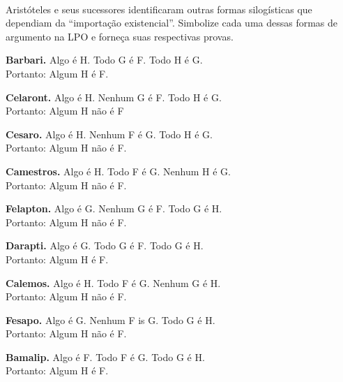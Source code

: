 \
 
\problempart
\label{pr.BarbaraEtc.proof2}
Aristóteles e seus sucessores identificaram outras formas silogísticas que dependiam da ``importação existencial''. Simbolize cada uma dessas formas de argumento na LPO e  forneça suas respectivas  provas.

\begin{earg}
	\item \textbf{Barbari.} Algo é H. Todo G é F. Todo H é G. \\  Portanto: Algum H é F.
	\item \textbf{Celaront.} Algo é H. Nenhum G é F. Todo H é G. \\ Portanto: Algum H não é F
	\item \textbf{Cesaro.} Algo é H. Nenhum F é G. Todo H é G. \\ Portanto: Algum H não é  F.
	\item \textbf{Camestros.} Algo é H. Todo F é G. Nenhum H é G. \\  Portanto: Algum H não é F.
	\item \textbf{Felapton.} Algo é G. Nenhum G é F. Todo G é H. \\ Portanto: Algum H não é F.
	\item \textbf{Darapti.} Algo é G. Todo G é F. Todo G é H.  \\ Portanto: Algum H é F.
	\item \textbf{Calemos.} Algo é H. Todo F é G. Nenhum G é H. \\ Portanto: Algum H não é F.
	\item \textbf{Fesapo.} Algo é G. Nenhum F is G. Todo G é H. \\ Portanto: Algum H não é F.
	\item \textbf{Bamalip.} Algo é F. Todo F é G. Todo G é H. \\ Portanto: Algum H é F.
\end{earg}

